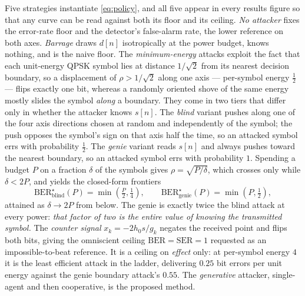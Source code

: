 Five strategies instantiate \eqref{eq:policy}, and all five appear in every results figure so that any curve can be read against both its floor and its ceiling.
\emph{No attacker} fixes the error-rate floor and the detector's false-alarm rate, the lower reference on both axes.
\emph{Barrage} draws $d[n]$ isotropically at the power budget, knows nothing, and is the naive floor.
The \emph{minimum-energy} attacks exploit the fact that each unit-energy QPSK symbol lies at distance $1/\sqrt{2}$ from its nearest decision boundary, so a displacement of $\rho > 1/\sqrt{2}$ along one axis --- per-symbol energy $\tfrac12$ --- flips exactly one bit, whereas a randomly oriented shove of the same energy mostly slides the symbol \emph{along} a boundary.
They come in two tiers that differ only in whether the attacker knows $s[n]$.
The \emph{blind} variant pushes along one of the four axis directions chosen at random and independently of the symbol; the push opposes the symbol's sign on that axis half the time, so an attacked symbol errs with probability $\tfrac12$.
The \emph{genie} variant reads $s[n]$ and always pushes toward the nearest boundary, so an attacked symbol errs with probability $1$.
Spending a budget $P$ on a fraction $\delta$ of the symbols gives $\rho = \sqrt{P/\delta}$, which crosses only while $\delta < 2P$, and yields the closed-form frontiers
\begin{equation}
  \mathrm{BER}^\star_{\text{blind}}(P) = \min\!\left(\tfrac{P}{2}, \tfrac14\right),
  \qquad
  \mathrm{BER}^\star_{\text{genie}}(P) = \min\!\left(P, \tfrac12\right),
  \label{eq:minenergy}
\end{equation}
attained as $\delta \to 2P$ from below. The genie is exactly twice the blind attack at every power: \emph{that factor of two is the entire value of knowing the transmitted symbol.}
The \emph{counter signal} $x_k = -2 h_0 s / g_k$ negates the received point and flips both bits, giving the omniscient ceiling $\mathrm{BER} = \mathrm{SER} = 1$ requested as an impossible-to-beat reference.
It is a ceiling on \emph{effect} only: at per-symbol energy $4$ it is the least efficient attack in the ladder, delivering $0.25$ bit errors per unit energy against the genie boundary attack's $0.55$.
The \emph{generative} attacker, single-agent and then cooperative, is the proposed method.

